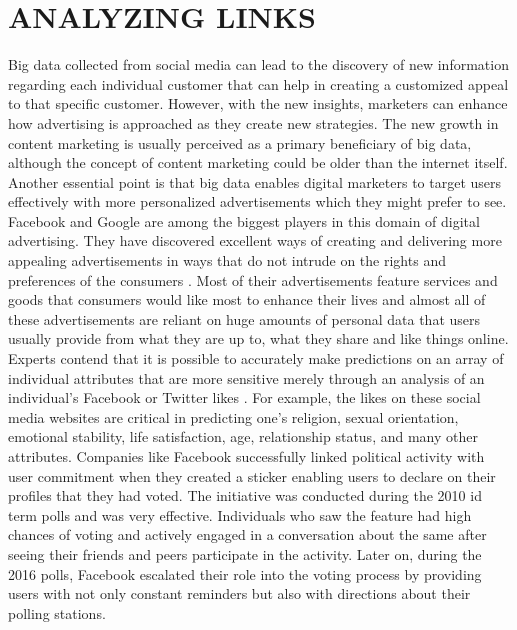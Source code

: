 \documentclass[sigconf]{acmart}
\begin{document}
\section{ANALYZING LINKS}

Big data collected from social media can lead to the discovery of new information regarding each individual customer that can help in creating a customized appeal to that specific customer. However, with the new insights, marketers can enhance how advertising is approached as they create new strategies. The new growth in content marketing is usually perceived as a primary beneficiary of big data, although the concept of content marketing could be older than the internet itself. \\
Another essential point is that big data enables digital marketers to target users effectively with more personalized advertisements which they might prefer to see. Facebook and Google are among the biggest players in this domain of digital advertising. They have discovered excellent ways of creating and delivering more appealing advertisements in ways that do not intrude on the rights and preferences of the consumers  \cite{MangoldandFaulds2009}. Most of their advertisements feature services and goods that consumers would like most to enhance their lives and almost all of these advertisements are reliant on huge amounts of personal data that users usually provide from what they are up to, what they share and like things online.  \\
Experts contend that it is possible to accurately make predictions on an array of individual attributes that are more sensitive merely through an analysis of an individual’s Facebook or Twitter likes \cite{Nate2014}. For example, the likes on these social media websites are critical in predicting one’s religion, sexual orientation, emotional stability, life satisfaction, age, relationship status, and many other attributes. Companies like Facebook successfully linked political activity with user commitment when they created a sticker enabling users to declare on their profiles that they had voted. The initiative was conducted during the 2010 id term polls and was very effective. Individuals who saw the feature had high chances of voting and actively engaged in a conversation about the same after seeing their friends and peers participate in the activity. Later on, during the 2016 polls, Facebook escalated their role into the voting process by providing users with not only constant reminders but also with directions about their polling stations.
\end{document}
